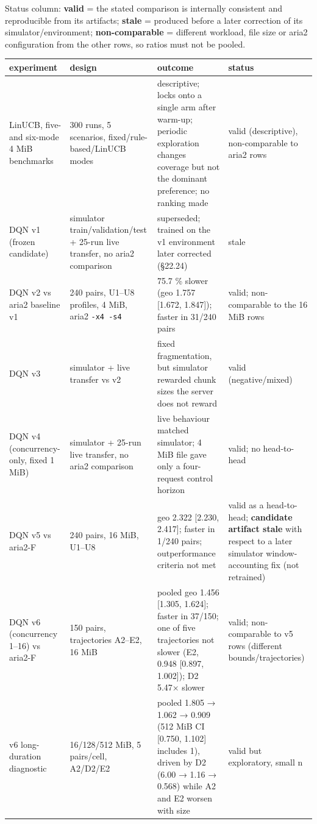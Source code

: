 \documentclass{ieeeaccess}
\begin{document}
Status column: \textbf{valid} = the stated comparison is internally consistent and reproducible from its artifacts; \textbf{stale} = produced before a later correction of its simulator/environment; \textbf{non-comparable} = different workload, file size or aria2 configuration from the other rows, so ratios must not be pooled.


\begin{table}[!t]\centering\footnotesize
\begin{tabularx}{\textwidth}{@{}LLLL@{}}
\toprule
\textbf{experiment} & \textbf{design} & \textbf{outcome} & \textbf{status}\\
\midrule
LinUCB, five- and six-mode 4 MiB benchmarks & 300 runs, 5 scenarios, fixed/rule-based/LinUCB modes & descriptive; locks onto a single arm after warm-up; periodic exploration changes coverage but not the dominant preference; no ranking made & valid (descriptive), non-comparable to aria2 rows\\
DQN v1 (frozen candidate) & simulator train/validation/test + 25-run live transfer, no aria2 comparison & superseded; trained on the v1 environment later corrected (§22.24) & stale\\
DQN v2 vs aria2 baseline v1 & 240 pairs, U1–U8 profiles, 4 MiB, aria2 \texttt{-x4 -s4} & 75.7 \% slower (geo 1.757 [1.672, 1.847]); faster in 31/240 pairs & valid; non-comparable to the 16 MiB rows\\
DQN v3 & simulator + live transfer vs v2 & fixed fragmentation, but simulator rewarded chunk sizes the server does not reward & valid (negative/mixed)\\
DQN v4 (concurrency-only, fixed 1 MiB) & simulator + 25-run live transfer, no aria2 comparison & live behaviour matched simulator; 4 MiB file gave only a four-request control horizon & valid; no head-to-head\\
DQN v5 vs aria2-F & 240 pairs, 16 MiB, U1–U8 & geo 2.322 [2.230, 2.417]; faster in 1/240 pairs; outperformance criteria not met & valid as a head-to-head; \textbf{candidate artifact stale} with respect to a later simulator window-accounting fix (not retrained)\\
DQN v6 (concurrency 1–16) vs aria2-F & 150 pairs, trajectories A2–E2, 16 MiB & pooled geo 1.456 [1.305, 1.624]; faster in 37/150; one of five trajectories not slower (E2, 0.948 [0.897, 1.002]); D2 5.47× slower & valid; non-comparable to v5 rows (different bounds/trajectories)\\
v6 long-duration diagnostic & 16/128/512 MiB, 5 pairs/cell, A2/D2/E2 & pooled 1.805 → 1.062 → 0.909 (512 MiB CI [0.750, 1.102] includes 1), driven by D2 (6.00 → 1.16 → 0.568) while A2 and E2 worsen with size & valid but exploratory, small n\\
\bottomrule
\end{tabularx}
\end{table}
\end{document}
